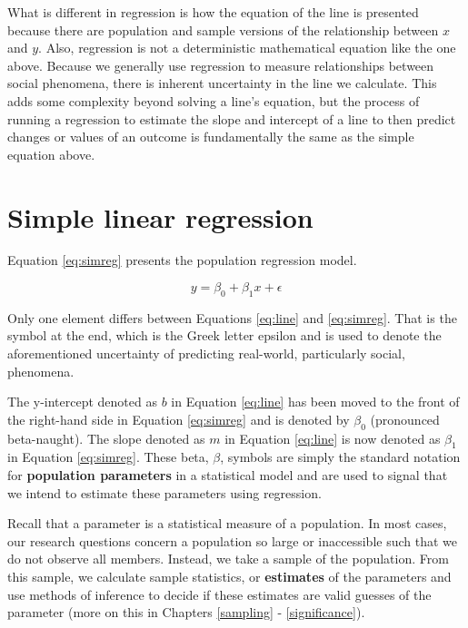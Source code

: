 \documentclass[
]{book}
\begin{document}
What is different in regression is how the equation of the line is presented because there are population and sample versions of the relationship between \(x\) and \(y\). Also, regression is not a deterministic mathematical equation like the one above. Because we generally use regression to measure relationships between social phenomena, there is inherent uncertainty in the line we calculate. This adds some complexity beyond solving a line's equation, but the process of running a regression to estimate the slope and intercept of a line to then predict changes or values of an outcome is fundamentally the same as the simple equation above.

\hypertarget{simple-linear-regression}{%
\section{Simple linear regression}\label{simple-linear-regression}}

Equation \eqref{eq:simreg} presents the population regression model.

\begin{equation}
y=\beta_0+\beta_1x+\epsilon
\label{eq:simreg}
\end{equation}

Only one element differs between Equations \eqref{eq:line} and \eqref{eq:simreg}. That is the symbol at the end, which is the Greek letter epsilon and is used to denote the aforementioned uncertainty of predicting real-world, particularly social, phenomena.

The y-intercept denoted as \(b\) in Equation \eqref{eq:line} has been moved to the front of the right-hand side in Equation \eqref{eq:simreg} and is denoted by \(\beta_0\) (pronounced beta-naught). The slope denoted as \(m\) in Equation \eqref{eq:line} is now denoted as \(\beta_1\) in Equation \eqref{eq:simreg}. These beta, \(\beta\), symbols are simply the standard notation for \textbf{population parameters} in a statistical model and are used to signal that we intend to estimate these parameters using regression.

Recall that a parameter is a statistical measure of a population. In most cases, our research questions concern a population so large or inaccessible such that we do not observe all members. Instead, we take a sample of the population. From this sample, we calculate sample statistics, or \textbf{estimates} of the parameters and use methods of inference to decide if these estimates are valid guesses of the parameter (more on this in Chapters \ref{sampling} - \ref{significance}).
\end{document}
